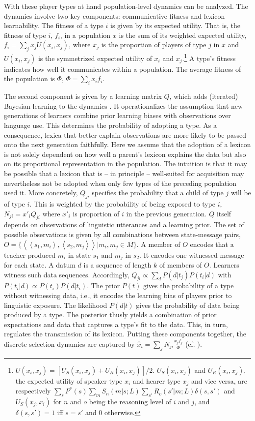\documentclass[10pt,a4paper]{article}
\newcommand{\tuple}[1]{\ensuremath{\left\langle #1 \right\rangle}}
\begin{document}
With these player types at hand population-level dynamics can be analyzed. The dynamics involve two key components: communicative fitness and lexicon learnability. The fitness of a type $i$ is given by its expected utility. That is, the fitness of type $i$, $f_i$, in a population $x$ is the sum of its weighted expected utility, $f_i = \sum_j x_j U(x_i,x_j)$, where $x_j$ is the proportion of players of type $j$ in $x$ and $U(x_i,x_j)$ is the symmetrized expected utility of $x_i$ and $x_j$.\footnote{$U(x_i,x_j) = [U_S(x_i,x_j) + U_R(x_i,x_j)]/2$. $U_S(x_i,x_j)$ and $U_R(x_i,x_j)$, the expected utility of speaker type $x_i$ and hearer type $x_j$ and vice versa, are respectively $\sum_s P^*(s) \sum_m S_n(m|s;L) \sum_{s'} R_o(s'|m;L) \delta(s,s')$ and $U_S(x_j,x_i)$ for $n$ and $o$ being the reasoning level of $i$ and $j$, and $\delta(s,s') = 1$ iff $s = s'$ and $0$ otherwise.}  A type's fitness indicates how well it communicates within a population. The average fitness of the population is  $\Phi$, $\Phi = \sum_i x_i f_i$.


The second component is given by a learning matrix $Q$, which adds (iterated) Bayesian learning to the dynamics \citep{griffiths+kalish:2007}. It operationalizes the assumption that new generations of learners combine prior learning biases with observations over language use. This determines the probability of adopting a type. As a consequence, lexica that better explain observations are more likely to be passed onto the next generation faithfully. Here we assume that the adoption of a lexicon is not solely dependent on how well a parent's lexicon explains the data but also on its proportional representation in the population. The intuition is that it may be possible that a lexicon that is -- in principle -- well-suited for acquisition may nevertheless not be adopted when only few types of the preceding population used it. More concretely, $Q_{ji}$ specifies the probability that a child of type $j$ will be of type $i$. This is weighted by the probability of being exposed to type $i$, $N_{ji} = x'_i Q_{ji}$ where $x'_i$ is proportion of $i$ in the previous generation. $Q$ itself depends on observations of linguistic utterances and a learning prior. The set of possible observations is given by all combinations between state-message pairs, $O =  \{\tuple{\tuple{s_1,m_i},\tuple{s_2,m_j}} | m_i, m_j \in M\}$. A member of $O$ encodes that a teacher produced $m_i$ in state $s_1$ and $m_j$ in $s_2$. It encodes one witnessed message for each state. A datum $d$ is a sequence of length $k$ of members of $O$. Learners witness such data sequences. Accordingly, $Q_{ji} \propto \sum_d P(d|t_j) P(t_i|d)$ with $P(t_i|d) \propto P(t_i)P(d|t_i)$. The prior  $P(t)$ gives the probability of a type without witnessing data, i.e., it encodes the learning bias of players prior to linguistic exposure. The likelihood $P(d|t)$ gives the probability of data being produced by a type. The posterior thusly yields a combination of prior expectations and data that captures a type's fit to the data. This, in turn, regulates the transmission of its lexicon. Putting these components together, the discrete selection dynamics are captured by $\hat{x}_i = \sum_j N_{ji} \frac{x_j f_j}{\Phi}$ (cf. \citealt{hofbauer+sigmund:2003}).
\end{document}
